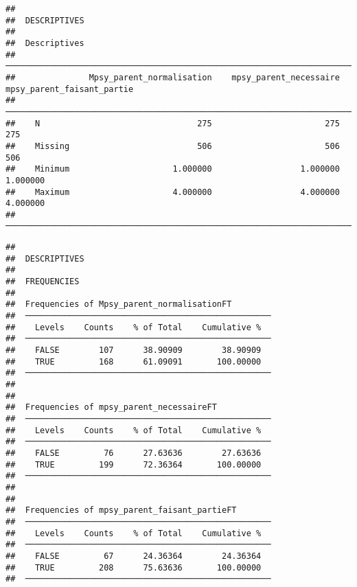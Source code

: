 \documentclass[
]{article}
\begin{document}
\begin{verbatim}
## 
##  DESCRIPTIVES
## 
##  Descriptives                                                                                     
##  ──────────────────────────────────────────────────────────────────────────────────────────────── 
##               Mpsy_parent_normalisation    mpsy_parent_necessaire    mpsy_parent_faisant_partie   
##  ──────────────────────────────────────────────────────────────────────────────────────────────── 
##    N                                275                       275                           275   
##    Missing                          506                       506                           506   
##    Minimum                     1.000000                  1.000000                      1.000000   
##    Maximum                     4.000000                  4.000000                      4.000000   
##  ────────────────────────────────────────────────────────────────────────────────────────────────
\end{verbatim}

\begin{verbatim}
## 
##  DESCRIPTIVES
## 
##  FREQUENCIES
## 
##  Frequencies of Mpsy_parent_normalisationFT         
##  ────────────────────────────────────────────────── 
##    Levels    Counts    % of Total    Cumulative %   
##  ────────────────────────────────────────────────── 
##    FALSE        107      38.90909        38.90909   
##    TRUE         168      61.09091       100.00000   
##  ────────────────────────────────────────────────── 
## 
## 
##  Frequencies of mpsy_parent_necessaireFT            
##  ────────────────────────────────────────────────── 
##    Levels    Counts    % of Total    Cumulative %   
##  ────────────────────────────────────────────────── 
##    FALSE         76      27.63636        27.63636   
##    TRUE         199      72.36364       100.00000   
##  ────────────────────────────────────────────────── 
## 
## 
##  Frequencies of mpsy_parent_faisant_partieFT        
##  ────────────────────────────────────────────────── 
##    Levels    Counts    % of Total    Cumulative %   
##  ────────────────────────────────────────────────── 
##    FALSE         67      24.36364        24.36364   
##    TRUE         208      75.63636       100.00000   
##  ──────────────────────────────────────────────────
\end{verbatim}
\end{document}
